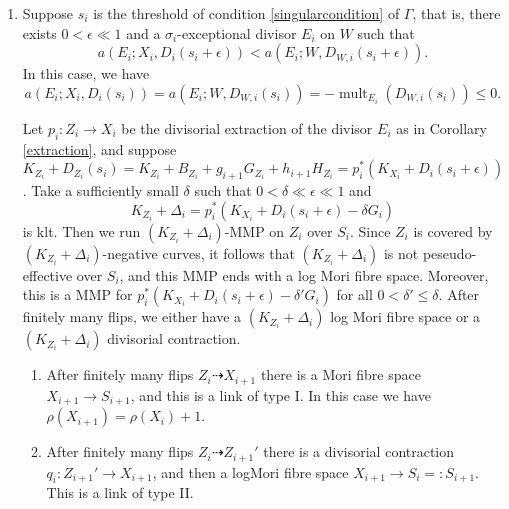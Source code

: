 \documentclass[11pt]{amsart}
\numberwithin{equation}{section}
\begin{document}
\begin{enumerate}
\begin{enumerate}
  \end{enumerate}
\item\label{2b} Suppose $s_{i}$ is the threshold of condition \ref{singularcondition} of $\Gamma$, that is, there exists  $0<\epsilon \ll 1$ and a $\sigma_{i}$-exceptional divisor $E_{i}$ on $W$ such that 
    \[
      a(E_{i};X_{i},D_{i}(s_{i}+\epsilon))< a(E_{i};W,D_{W,i}(s_{i}+\epsilon))
    .\]
   In this case, we have 
    \[
  a(E_{i};X_{i},D_{i}(s_{i}))= a(E_{i};W,D_{W,i}(s_{i}))=-\operatorname{mult}_{E_{i}}(D_{W,i}(s_{i}))\leqslant 0
    .\]

    Let $p_{i}:Z_{i}\to X_{i}$ be the divisorial extraction of the divisor $E_{i}$ as in Corollary \ref{extraction}, and suppose $K_{Z_{i}}+D_{Z_{i}}(s_{i})=K_{Z_{i}}+B_{Z_{i}}+g_{i+1}G_{Z_{i}}+h_{i+1}H_{Z_{i}}=p_{i}^*\left(K_{X_{i}}+D_{i}\left(s_{i}+\epsilon\right)\right)$.
   Take a sufficiently small $\delta$ such that $0<\delta \ll \epsilon \ll 1$ and
   \[
     K_{Z_{i}}+\Delta_{i}=p_{i}^*(K_{X_{i}}+D_{i}(s_{i}+\epsilon)-\delta G_{i})
   \]
  is klt. Then we run $(K_{Z_{i}}+\Delta_{i})$-MMP on $Z_{i}$ over $S_{i}$. Since $Z_{i}$ is covered by $(K_{Z_{i}}+\Delta_{i})$-negative curves, it follows that $(K_{Z_{i}}+\Delta_{i})$ is not peseudo-effective over $S_{i}$, and  this MMP ends with a log Mori fibre space. Moreover, this is a MMP for $p_{i}^*(K_{X_{i}}+D_{i}(s_{i}+\epsilon)-\delta'G_{i})$ for all $0<\delta'\leqslant\delta$. After finitely many flips, we either have a $(K_{Z_{i}}+\Delta_{i})$ log Mori fibre space or a $(K_{Z_{i}}+\Delta_{i})$ divisorial contraction.
  \begin{enumerate}
    \item\label{2b1} After finitely many flips $Z_{i}\dashrightarrow X_{i+1}$ there is a Mori fibre space $X_{i+1}\to S_{i+1}$, and this is a link of type I. In this case we have $\rho(X_{i+1})=\rho(X_{i})+1$.
    \item\label{2b2} After finitely many flips $Z_{i}\dashrightarrow Z_{i+1}'$ there is a divisorial contraction $q_{i}:Z_{i+1}'\to X_{i+1}$, and then a logMori fibre space $X_{i+1}\to S_{i}=:S_{i+1}$. This is a link of type II.
  \end{enumerate}
\end{enumerate}
\end{document}
